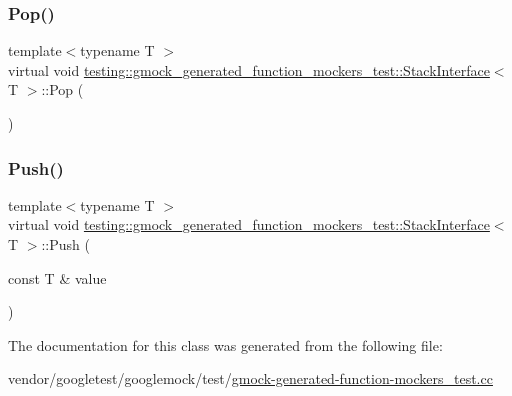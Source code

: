 \subsubsection{\texorpdfstring{Pop()}{Pop()}}
{\footnotesize\ttfamily template$<$typename T $>$ \\
virtual void \hyperlink{classtesting_1_1gmock__generated__function__mockers__test_1_1_stack_interface}{testing\+::gmock\+\_\+generated\+\_\+function\+\_\+mockers\+\_\+test\+::\+Stack\+Interface}$<$ T $>$\+::Pop (\begin{DoxyParamCaption}{ }\end{DoxyParamCaption})\hspace{0.3cm}{\ttfamily [pure virtual]}}

\mbox{\label{classtesting_1_1gmock__generated__function__mockers__test_1_1_stack_interface_a49448f6195021fee947d37b80b6e5d30}} 
\subsubsection{\texorpdfstring{Push()}{Push()}}
{\footnotesize\ttfamily template$<$typename T $>$ \\
virtual void \hyperlink{classtesting_1_1gmock__generated__function__mockers__test_1_1_stack_interface}{testing\+::gmock\+\_\+generated\+\_\+function\+\_\+mockers\+\_\+test\+::\+Stack\+Interface}$<$ T $>$\+::Push (\begin{DoxyParamCaption}\item[{const T \&}]{value }\end{DoxyParamCaption})\hspace{0.3cm}{\ttfamily [pure virtual]}}



The documentation for this class was generated from the following file\+:\begin{DoxyCompactItemize}
\item 
vendor/googletest/googlemock/test/\hyperlink{gmock-generated-function-mockers__test_8cc}{gmock-\/generated-\/function-\/mockers\+\_\+test.\+cc}\end{DoxyCompactItemize}

